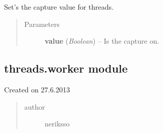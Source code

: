 \documentclass[letterpaper,10pt,english]{sphinxmanual}
\begin{document}

\begin{fulllineitems}
\label{threads:threads.inputcapture.set_capture}
Set's the capture value for threads.
\begin{quote}\begin{description}
\item[{Parameters}] \leavevmode
\textbf{value} (\emph{Boolean}) -- Is the capture on.

\end{description}\end{quote}

\end{fulllineitems}



\subsection{threads.worker module}
\label{threads:threads-worker-module}\label{threads:module-threads.worker}
Created on 27.6.2013
\begin{quote}\begin{description}
\item[{author}] \leavevmode
neriksso

\end{description}\end{quote}
\end{document}
